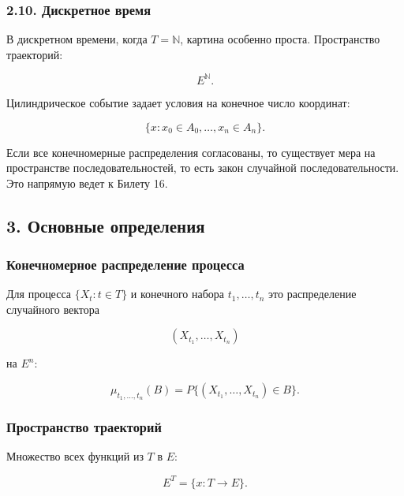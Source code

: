 \documentclass[
  11pt,
  a4paper,
]{article}
\begin{document}
\subsubsection{2.10. Дискретное
время}\label{ux434ux438ux441ux43aux440ux435ux442ux43dux43eux435-ux432ux440ux435ux43cux44f}

В дискретном времени, когда \(T=\mathbb N\), картина особенно проста.
Пространство траекторий:

\[
E^{\mathbb N}.
\]

Цилиндрическое событие задает условия на конечное число координат:

\[
\{x:x_0\in A_0,\ldots,x_n\in A_n\}.
\]

Если все конечномерные распределения согласованы, то существует мера на
пространстве последовательностей, то есть закон случайной
последовательности. Это напрямую ведет к Билету 16.

\subsection{3. Основные
определения}\label{ux43eux441ux43dux43eux432ux43dux44bux435-ux43eux43fux440ux435ux434ux435ux43bux435ux43dux438ux44f}

\subsubsection{Конечномерное распределение
процесса}\label{ux43aux43eux43dux435ux447ux43dux43eux43cux435ux440ux43dux43eux435-ux440ux430ux441ux43fux440ux435ux434ux435ux43bux435ux43dux438ux435-ux43fux440ux43eux446ux435ux441ux441ux430}

Для процесса \(\{X_t:t\in T\}\) и конечного набора \(t_1,\ldots,t_n\)
это распределение случайного вектора

\[
(X_{t_1},\ldots,X_{t_n})
\]

на \(E^n\):

\[
\mu_{t_1,\ldots,t_n}(B)
=
P\{(X_{t_1},\ldots,X_{t_n})\in B\}.
\]

\subsubsection{Пространство
траекторий}\label{ux43fux440ux43eux441ux442ux440ux430ux43dux441ux442ux432ux43e-ux442ux440ux430ux435ux43aux442ux43eux440ux438ux439}

Множество всех функций из \(T\) в \(E\):

\[
E^T=\{x:T\to E\}.
\]
\end{document}

